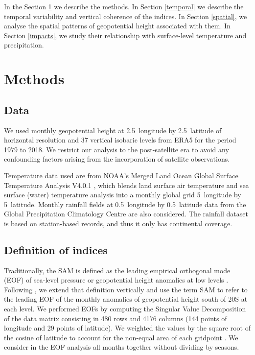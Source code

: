 \documentclass[smallextended]{svjour3}       %
\begin{document}
In the Section \ref{methods} we describe the methods. In Section \ref{temporal} we describe the temporal variability and vertical coherence of the indices. In Section \ref{spatial}, we analyse the spatial patterns of geopotential height associated with them. In Section \ref{impacts}, we study their relationship with surface-level temperature and precipitation.

\hypertarget{methods}{%
\section{Methods}\label{methods}}

\hypertarget{data}{%
\subsection{Data}\label{data}}

We used monthly geopotential height at 2.5\degree~longitude by 2.5\degree~latitude of horizontal resolution and 37 vertical isobaric levels from ERA5 \citep{hersbach2020} for the period 1979 to 2018. We restrict our analysis to the post-satellite era to avoid any confounding factors arising from the incorporation of satellite observations.

Temperature data used are from NOAA's Merged Land Ocean Global Surface Temperature Analysis V4.0.1 \citep{smith2008, vose2012}, which blends land surface air temperature and sea surface (water) temperature analysis into a monthly global grid 5\degree~longitude by 5\degree~latitude. Monthly rainfall fields at 0.5\degree~longitude by 0.5\degree~latitude data from the Global Precipitation Climatology Centre \citep{schneider2015, schneider2017} are also considered. The rainfall dataset is based on station-based records, and thus it only has continental coverage.

\hypertarget{definition-of-indices}{%
\subsection{Definition of indices}\label{definition-of-indices}}

Traditionally, the SAM is defined as the leading empirical orthogonal mode (EOF) of sea-level pressure or geopotential height anomalies at low levels \citep{ho2012}. Following \citet{baldwin2001}, we extend that definition vertically and use the term SAM to refer to the leading EOF of the monthly anomalies of geopotential height south of 20\degree S at each level. We performed EOFs by computing the Singular Value Decomposition of the data matrix consisting in 480 rows and 4176 columns (144 points of longitude and 29 points of latitude). We weighted the values by the square root of the cosine of latitude to account for the non-equal area of each gridpoint \citep{chung1999}. We consider in the EOF analysis all months together without dividing by seasons.
\end{document}
